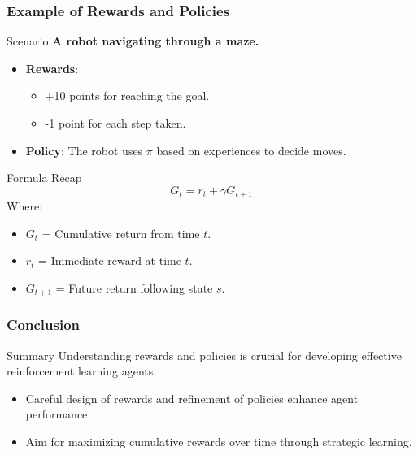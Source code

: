 \documentclass[aspectratio=169]{beamer}
\begin{document}
\begin{frame}[fragile]
    \frametitle{Example of Rewards and Policies}
    \begin{block}{Scenario}
        \textbf{A robot navigating through a maze.}
    \end{block}
    \begin{itemize}
        \item \textbf{Rewards}: 
        \begin{itemize}
            \item +10 points for reaching the goal.
            \item -1 point for each step taken.
        \end{itemize}
        \item \textbf{Policy}: 
        The robot uses \( \pi \) based on experiences to decide moves.
    \end{itemize}

    \begin{block}{Formula Recap}
        \begin{equation}
            G_t = r_t + \gamma G_{t+1} 
        \end{equation}
        Where:
        \begin{itemize}
            \item \( G_t \) = Cumulative return from time \( t \).
            \item \( r_t \) = Immediate reward at time \( t \).
            \item \( G_{t+1} \) = Future return following state \( s \).
        \end{itemize}
    \end{block}
\end{frame}

\begin{frame}[fragile]
    \frametitle{Conclusion}
    \begin{block}{Summary}
        Understanding rewards and policies is crucial for developing effective reinforcement learning agents. 
        \begin{itemize}
            \item Careful design of rewards and refinement of policies enhance agent performance.
            \item Aim for maximizing cumulative rewards over time through strategic learning.
        \end{itemize}
    \end{block}
\end{frame}
\end{document}
